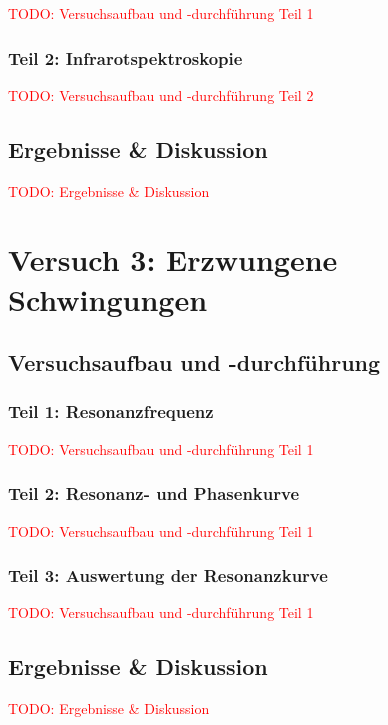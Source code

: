             \textcolor{red}{TODO: Versuchsaufbau und -durchführung Teil 1}

        \subsubsection{Teil 2: Infrarotspektroskopie}
        
            \textcolor{red}{TODO: Versuchsaufbau und -durchführung Teil 2}

    \subsection{Ergebnisse \& Diskussion}

        \textcolor{red}{TODO: Ergebnisse \& Diskussion}

\newpage

\section{Versuch 3: Erzwungene Schwingungen}

    \subsection{Versuchsaufbau und -durchführung}

        \subsubsection{Teil 1: Resonanzfrequenz}
        
            \textcolor{red}{TODO: Versuchsaufbau und -durchführung Teil 1}

        \subsubsection{Teil 2: Resonanz- und Phasenkurve}
        
            \textcolor{red}{TODO: Versuchsaufbau und -durchführung Teil 1}
        
        \subsubsection{Teil 3: Auswertung der Resonanzkurve}
            
            \textcolor{red}{TODO: Versuchsaufbau und -durchführung Teil 1}
    
    \subsection{Ergebnisse \& Diskussion}
        
        \textcolor{red}{TODO: Ergebnisse \& Diskussion}